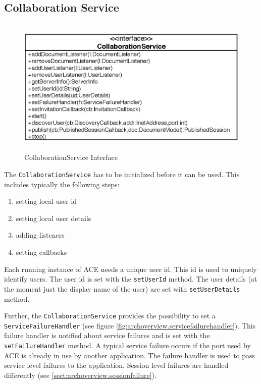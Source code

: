 \subsection{Collaboration Service}

\begin{figure}[H]
 \centering
 \includegraphics[width=13.19cm,height=6.63cm]{../images/finalreport/architecture_collaborationservice_uml.eps}
 \caption{CollaborationService Interface}
\end{figure}

The \texttt{Collaboration\-Service} has to be initialized before it can
be used. This includes typically the following steps:

\begin{enumerate}
 \item setting local user id
 \item setting local user details
 \item adding listeners
 \item setting callbacks
\end{enumerate}

Each running instance of ACE needs a unique user id. This id is used to uniquely
identify users. The user id is set with the \texttt{set\-User\-Id} method. The
user details (at the moment just the display name of the user) are set with
\texttt{set\-User\-Details} method.

Further, the \texttt{Collaboration\-Service} provides the possibility to set a
\texttt{Service\-Failure\-Handler} 
(see figure \ref{fig:archoverview.servicefailurehandler}). 
This failure handler is notified about 
service failures and is set with the \texttt{set\-Failure\-Handler} method. 
A typical service failure occurs if the port used by
ACE is already in use by another application. The failure handler is used
to pass service level failures to the application. Session level failures
are handled differently (see \ref{sect:archoverview.sessionfailure}). 

